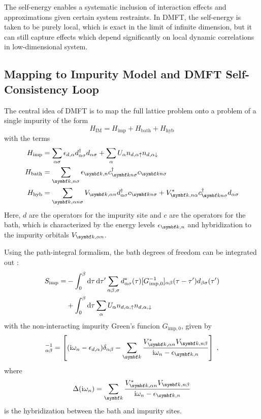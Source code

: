 \documentclass[../main.tex]{subfiles}
\begin{document}
The self-energy enables a systematic inclusion of interaction effects and approximations given certain system restraints.
In DMFT, the self-energy is taken to be purely local, which is exact in the limit of infinite dimension, but it can still capture effects which depend significantly on local dynamic correlations in low-dimensional system.

\subsection*{Mapping to Impurity Model and DMFT Self-Consistency Loop}

The central idea of DMFT is to map the full lattice problem onto a problem of a single impurity of the form
\begin{equation}
	H_{\mathrm{IM}} = H_{\mathrm{imp}} + H_{\mathrm{bath}} + H_{\mathrm{hyb}}
\end{equation}
with the terms
\begin{align}
	H_{\mathrm{imp}} &= \sum_{\alpha \sigma} \epsilon_{d, \alpha} d_{\alpha \sigma}^{\dagger} d_{\alpha \sigma} + \sum_{\alpha} U_{\alpha} n_{d, \alpha \uparrow} n_{d, \alpha \downarrow} \\
	H_{\mathrm{bath}} &= \sum_{\vb{k}, n \sigma} \epsilon_{\vb{k}, n} c_{\vb{k} n \sigma}^{\dagger} c_{\vb{k} n \sigma}  \\
	H_{\mathrm{hyb}} &= \sum_{\vb{k}, \alpha n \sigma} V_{\vb{k}, \alpha n} d_{\alpha \sigma}^{\dagger} c_{\vb{k} n \sigma} + V_{\vb{k}, n \alpha}^* c_{\vb{k} n \sigma}^{\dagger} d_{\alpha \sigma}
\end{align}
Here, \(d\) are the operators for the impurity site and \(c\) are the operators for the bath, which is characterized by the energy levels \(\epsilon_{\vb{k}, n}\) and hybridization to the impurity orbitals \(V_{\vb{k}, \alpha n}\).

Using the path-integral formalism, the bath degrees of freedom can be integrated out \cite{georgesDynamicalMeanfieldTheory1996}:
\begin{align}
	S_{\mathrm{imp}} = &-\int_{0}^{\beta} \odif{\tau} \odif{\tau^{\prime}} \sum_{\alpha \beta, \sigma} d^*_{\alpha \sigma} (\tau) [G_{\mathrm{imp}, 0}^{-1}]_{\alpha \beta} (\tau - \tau^{\prime}) d_{\beta \sigma} (\tau^{\prime}) \\
	&+ \int_{0}^{\beta} \odif{\tau} \sum_{\alpha} U_{\alpha} n_{d, \alpha, \uparrow} n_{d, \alpha, \downarrow}
\end{align}
with the non-interacting impurity Green's funcion \(G_{\mathrm{imp}, 0}\), given by
\begin{equation}
	[G_{\mathrm{imp}, 0}]_{\alpha \beta}^{-1} = \left[(\iu \omega_n - \epsilon_{d, \alpha}) \delta_{\alpha \beta} - \sum_{\vb{k}} \frac{V_{\vb{k}, \alpha n}^* V_{\vb{k}, n \beta}}{\iu \omega_n - \epsilon_{\vb{k}, n}} \right]\;,
\end{equation}
where 
\begin{equation}
	\Delta (\iu \omega_n) = \sum_{\vb{k}} \frac{V_{\vb{k}, \alpha n}^* V_{\vb{k}, n \beta}}{\iu \omega_n - \epsilon_{\vb{k}, n}}
\end{equation}
is the hybridization between the bath and impurity sites.
\end{document}
